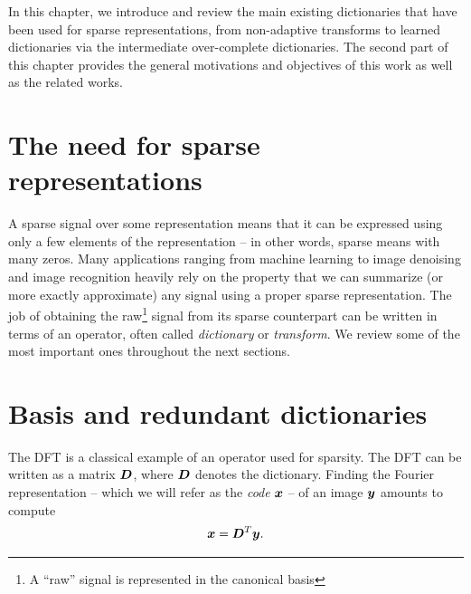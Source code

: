 In this chapter, we introduce and review the main existing dictionaries that have been used for sparse representations, from non-adaptive transforms to learned dictionaries via the intermediate over-complete dictionaries. The second part of this chapter provides the general motivations and objectives of this work as well as the related works.

\section{The need for sparse representations}

A sparse signal over some representation means that it can be expressed using only a few elements of the representation – in other words, sparse means with many zeros. Many applications ranging from machine learning to image denoising and image recognition heavily rely on the property that we can summarize (or more exactly approximate) any signal using a proper sparse representation. The job of obtaining the raw\footnote{A “raw” signal is represented in the canonical basis} signal from its sparse counterpart can be written in terms of an operator, often called \emph{dictionary} or \emph{transform}. We review some of the most important ones throughout the next sections.

\section{Basis and redundant dictionaries}

The \ac{DFT} is a classical example of an operator used for sparsity. The \ac{DFT} can be written as a matrix $\bm{D}$, where $\bm{D}$ denotes the dictionary. Finding the Fourier representation – which we will refer as the \emph{code} $\bm{x}$ – of an image $\bm{y}$ amounts to compute 
\begin{equation*}\bm{x} = \bm{D}^T\bm{y}.\end{equation*}

